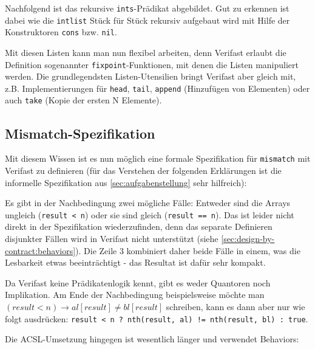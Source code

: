 Nachfolgend ist das rekursive \lstinline{ints}-Prädikat abgebildet. Gut zu erkennen ist dabei
wie die \lstinline{intlist} Stück für Stück rekursiv aufgebaut wird mit Hilfe der Konstruktoren
\lstinline{cons} bzw. \lstinline{nil}.



Mit diesen Listen kann man nun flexibel arbeiten, denn Verifast erlaubt die Definition sogenannter
\lstinline{fixpoint}-Funktionen, mit denen die Listen manipuliert werden. Die grundlegendsten
Listen-Utensilien bringt Verifast aber gleich mit, z.B. Implementierungen für \lstinline{head}, 
\lstinline{tail}, \lstinline{append} (Hinzufügen von Elementen) oder auch \lstinline{take} 
(Kopie der ersten N Elemente).



\subsection{Mismatch-Spezifikation}

Mit diesem Wissen ist es nun möglich eine formale Spezifikation für \lstinline{mismatch} mit Verifast
zu definieren (für das Verstehen der folgenden Erklärungen ist die informelle Spezifikation aus 
\ref{sec:aufgabenstellung} sehr hilfreich):



Es gibt in der Nachbedingung zwei mögliche Fälle: Entweder sind die Arrays ungleich
(\lstinline{result < n}) oder sie sind gleich (\lstinline{result == n}). Das ist leider nicht direkt
in der Spezifikation wiederzufinden, denn das separate Definieren disjunkter Fällen wird in Verifast 
nicht unterstützt (siehe \ref{sec:design-by-contract:behaviors}). Die Zeile 3 kombiniert daher beide Fälle 
in einem, was die Lesbarkeit etwas beeinträchtigt - das Resultat ist dafür sehr kompakt.

Da Verifast keine Prädikatenlogik kennt, gibt es weder Quantoren noch Implikation. Am Ende der
Nachbedingung beispielsweise möchte man \((result < n) \rightarrow al[result] \neq  bl[result]\)
schreiben, kann es dann aber nur wie folgt ausdrücken: 
\lstinline{result < n ? nth(result, al) != nth(result, bl) : true}.

Die ACSL-Umsetzung hingegen ist wesentlich länger und verwendet Behaviors:



